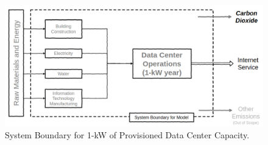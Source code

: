 \begin{figure}[h!]\centering
    \includegraphics[scale=0.4]{embodied_cost_model/images/system_boundary.png}
    \caption[System Boundary Diagram]{System Boundary for 1-kW of Provisioned Data Center Capacity.}
    \label{system_boundary}
    \end{figure}